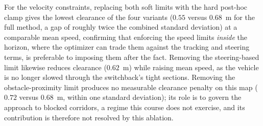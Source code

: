 \documentclass[journal]{IEEEtran}
\begin{document}
For the velocity constraints, replacing both soft limits with the hard post-hoc clamp gives the lowest clearance of the four variants ($0.55$ versus $0.68$~m for the full method, a gap of roughly twice the combined standard deviation) at a comparable mean speed, confirming that enforcing the speed limits \emph{inside} the horizon, where the optimizer can trade them against the tracking and steering terms, is preferable to imposing them after the fact. Removing the steering-based limit likewise reduces clearance ($0.62$~m) while raising mean speed, as the vehicle is no longer slowed through the switchback's tight sections. Removing the obstacle-proximity limit produces no measurable clearance penalty on this map ($0.72$ versus $0.68$~m, within one standard deviation); its role is to govern the approach to blocked corridors, a regime this course does not exercise, and its contribution is therefore not resolved by this ablation.
\end{document}
